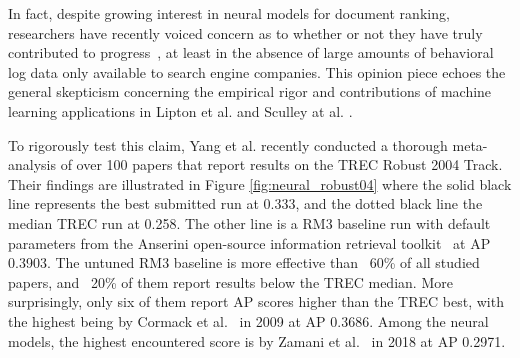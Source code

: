 In fact, despite growing interest in neural models for document ranking, researchers have recently voiced concern as to whether or not they have truly contributed to progress~\cite{lin2019neural}, at least in the absence of large amounts of behavioral log data only available to search engine companies.
This opinion piece echoes the general skepticism concerning the empirical rigor and contributions of machine learning applications in Lipton et al. \cite{lipton2018troubling} and Sculley at al. \cite{sculley2018winner}.

To rigorously test this claim, Yang et al. \cite{Yang_etal_SIGIR2019} recently conducted a thorough meta-analysis of over 100 papers that report results on the TREC Robust 2004 Track.
Their findings are illustrated in Figure \ref{fig:neural_robust04} where the solid black line represents the best submitted run at 0.333, and the dotted black line the median TREC run at 0.258.
The other line is a RM3 baseline run with default parameters from the Anserini open-source information retrieval toolkit~\cite{Yang:2018:ARR:3289400.3239571} at AP 0.3903.
The untuned RM3 baseline is more effective than ~60\% of all studied papers, and ~20\% of them report results below the TREC median.
More surprisingly, only six of them report AP scores higher than the TREC best, with the highest being by Cormack et al.~\cite{Cormack:2009:RRF:1571941.1572114} in 2009 at AP 0.3686.
Among the neural models, the highest encountered score is by Zamani et al.~\cite{zamani2018neural} in 2018 at AP 0.2971.

